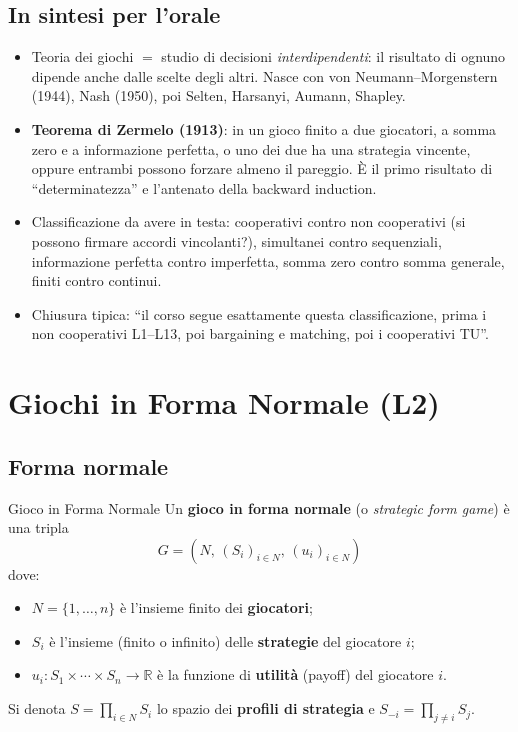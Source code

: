 \documentclass[12pt,a4paper,twoside]{book}
\theoremstyle{plain}
\theoremstyle{definition}
\begin{document}
\section*{In sintesi per l'orale}
\begin{itemize}
  \item Teoria dei giochi $=$ studio di decisioni \emph{interdipendenti}: il risultato di ognuno dipende anche dalle scelte degli altri. Nasce con von Neumann--Morgenstern (1944), Nash (1950), poi Selten, Harsanyi, Aumann, Shapley.
  \item \textbf{Teorema di Zermelo (1913)}: in un gioco finito a due giocatori, a somma zero e a informazione perfetta, o uno dei due ha una strategia vincente, oppure entrambi possono forzare almeno il pareggio. È il primo risultato di ``determinatezza'' e l'antenato della backward induction.
  \item Classificazione da avere in testa: cooperativi contro non cooperativi (si possono firmare accordi vincolanti?), simultanei contro sequenziali, informazione perfetta contro imperfetta, somma zero contro somma generale, finiti contro continui.
  \item Chiusura tipica: ``il corso segue esattamente questa classificazione, prima i non cooperativi L1--L13, poi bargaining e matching, poi i cooperativi TU''.
\end{itemize}

\chapter{Giochi in Forma Normale (L2)}

\section{Forma normale}

\begin{defbox}{Gioco in Forma Normale}
Un \textbf{gioco in forma normale} (o \emph{strategic form game}) è una tripla
\[
  G = (N,\, (S_i)_{i\in N},\, (u_i)_{i\in N})
\]
dove:
\begin{itemize}
  \item $N = \{1,\dots,n\}$ è l'insieme finito dei \textbf{giocatori};
  \item $S_i$ è l'insieme (finito o infinito) delle \textbf{strategie} del giocatore $i$;
  \item $u_i : S_1\times\cdots\times S_n \to \mathbb{R}$ è la funzione di \textbf{utilità} (payoff) del giocatore $i$.
\end{itemize}
Si denota $S = \prod_{i\in N} S_i$ lo spazio dei \textbf{profili di strategia} e $S_{-i} = \prod_{j\ne i} S_j$.
\end{defbox}
\end{document}
